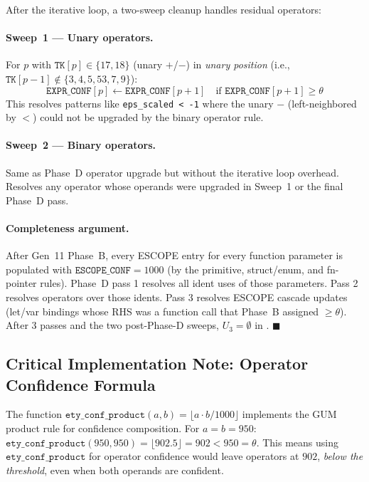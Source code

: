 After the iterative loop, a two-sweep cleanup handles residual operators:

\paragraph{Sweep~1 — Unary operators.}
For $p$ with $\mathtt{TK}[p] \in \{17, 18\}$ (unary $+$/$-$) in \emph{unary position}
(i.e., $\mathtt{TK}[p-1] \notin \{3, 4, 5, 53, 7, 9\}$):
\[
  \mathtt{EXPR\_CONF}[p] \leftarrow \mathtt{EXPR\_CONF}[p+1]
  \quad \text{if } \mathtt{EXPR\_CONF}[p+1] \geq \theta
\]
This resolves patterns like \texttt{eps\_scaled < -1} where the unary
$\mathtt{-}$ (left-neighbored by $\mathtt{<}$) could not be upgraded by the
binary operator rule.

\paragraph{Sweep~2 — Binary operators.}
Same as Phase~D operator upgrade but without the iterative loop overhead.
Resolves any operator whose operands were upgraded in Sweep~1 or the final
Phase~D pass.

\paragraph{Completeness argument.}
After Gen~11 Phase~B, every ESCOPE entry for every function parameter is
populated with $\mathtt{ESCOPE\_CONF} = 1000$ (by the primitive, struct/enum,
and fn-pointer rules).
Phase~D pass 1 resolves all ident uses of those parameters.
Pass 2 resolves operators over those idents.
Pass 3 resolves ESCOPE cascade updates (let/var bindings whose RHS was a
function call that Phase~B assigned $\geq \theta$).
After 3 passes and the two post-Phase-D sweeps, $U_3 = \emptyset$ in \lean.
$\blacksquare$

\subsection*{Critical Implementation Note: Operator Confidence Formula}

The function $\mathtt{ety\_conf\_product}(a, b) = \lfloor a \cdot b / 1000 \rfloor$
implements the GUM product rule for confidence composition.
For $a = b = 950$: $\mathtt{ety\_conf\_product}(950, 950) = \lfloor 902.5 \rfloor = 902 < 950 = \theta$.
This means using $\mathtt{ety\_conf\_product}$ for operator confidence would
leave operators at $902$, \emph{below the threshold}, even when both operands
are confident.

